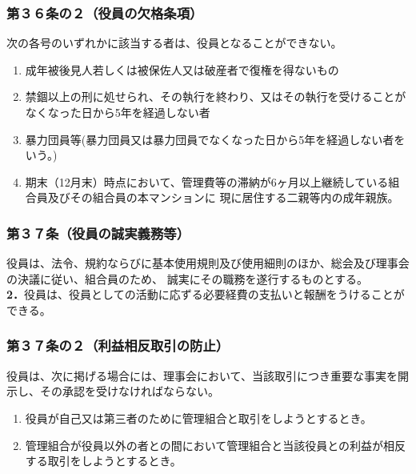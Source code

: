 \documentclass[
  luatex,
  paper=a4paper,
  fontsize=11pt,
  jafontsize=10pt,
  jlreq_notes,
]{jlreq}
\begin{document}
  \subsubsection*{第３６条の２（役員の欠格条項）}
  次の各号のいずれかに該当する者は、役員となることができない。
  \begin{enumerate}
  \item 成年被後見人若しくは被保佐人又は破産者で復権を得ないもの
  \item 禁錮以上の刑に処せられ、その執行を終わり、又はその執行を受けることがなくなった日から5年を経過しない者
  \item 暴力団員等(暴力団員又は暴力団員でなくなった日から5年を経過しない者をいう。)
  \item 期末（12月末）時点において、管理費等の滞納が6ヶ月以上継続している組合員及びその組合員の本マンションに
  現に居住する二親等内の成年親族。
  \end{enumerate}
  \subsubsection*{第３７条（役員の誠実義務等）}
  役員は、法令、規約ならびに基本使用規則及び使用細則のほか、総会及び理事会の決議に従い、組合員のため、
  誠実にその職務を遂行するものとする。\\
  \textbf{2．}役員は、役員としての活動に応ずる必要経費の支払いと報酬をうけることができる。
  \subsubsection*{第３７条の２（利益相反取引の防止）}
  役員は、次に掲げる場合には、理事会において、当該取引につき重要な事実を開示し、その承認を受けなければならない。
  \begin{enumerate}
  \item 役員が自己又は第三者のために管理組合と取引をしようとするとき。
  \item 管理組合が役員以外の者との間において管理組合と当該役員との利益が相反する取引をしようとするとき。
  \end{enumerate}
\end{document}
